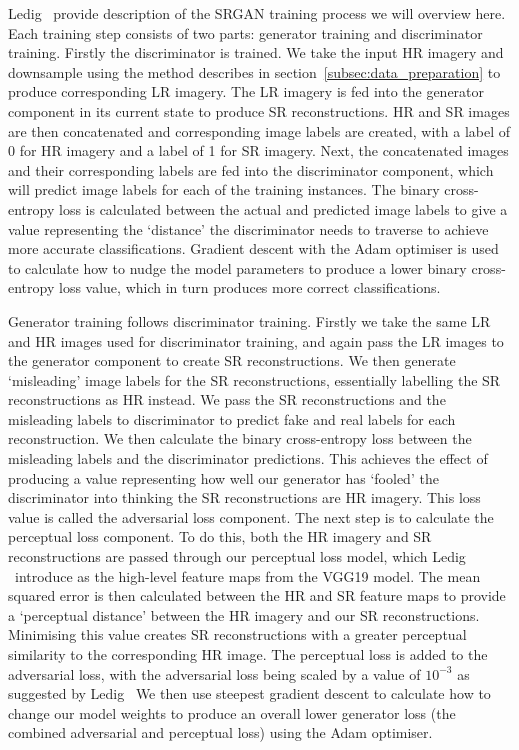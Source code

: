Ledig \etal\ provide description of the SRGAN training process we will overview here. Each training step consists of two parts: generator training and discriminator training. Firstly the discriminator is trained. We take the input HR imagery and downsample using the method describes in section~\ref{subsec:data_preparation} to produce corresponding LR imagery. The LR imagery is fed into the generator component in its current state to produce SR reconstructions. HR and SR images are then concatenated and corresponding image labels are created, with a label of 0 for HR imagery and a label of 1 for SR imagery. Next, the concatenated images and their corresponding labels are fed into the discriminator component, which will predict image labels for each of the training instances. The binary cross-entropy loss is calculated between the actual and predicted image labels to give a value representing the `distance' the discriminator needs to traverse to achieve more accurate classifications. Gradient descent with the Adam optimiser is used to calculate how to nudge the model parameters to produce a lower binary cross-entropy loss value, which in turn produces more correct classifications.

Generator training follows discriminator training. Firstly we take the same LR and HR images used for discriminator training, and again pass the LR images to the generator component to create SR reconstructions. We then generate `misleading' image labels for the SR reconstructions, essentially labelling the SR reconstructions as HR instead. We pass the SR reconstructions and the misleading labels to discriminator to predict fake and real labels for each reconstruction. We then calculate the binary cross-entropy loss between the misleading labels and the discriminator predictions. This achieves the effect of producing a value representing how well our generator has `fooled' the discriminator into thinking the SR reconstructions are HR imagery. This loss value is called the adversarial loss component. The next step is to calculate the perceptual loss component. To do this, both the HR imagery and SR reconstructions are passed through our perceptual loss model, which Ledig \etal \ introduce as the high-level feature maps from the VGG19 model. The mean squared error is then calculated between the HR and SR feature maps to provide a `perceptual distance' between the HR imagery and our SR reconstructions. Minimising this value creates SR reconstructions with a greater perceptual similarity to the corresponding HR image. The perceptual loss is added to the adversarial loss, with the adversarial loss being scaled by a value of $10^{-3}$ as suggested by Ledig \etal \ We then use steepest gradient descent to calculate how to change our model weights to produce an overall lower generator loss (the combined adversarial and perceptual loss) using the Adam optimiser.

